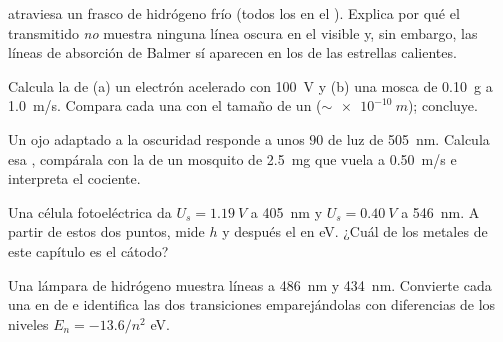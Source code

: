 \begin{exercise}[$\star\star$]\label{exo:g12:quantum-world:9}
 atraviesa un frasco de hidrógeno frío (todos los  en el ). Explica por qué el  transmitido \emph{no} muestra ninguna línea
oscura en el visible y, sin embargo, las líneas de absorción de Balmer sí aparecen en
los  de las estrellas calientes.
\end{exercise}

\begin{exercise}[$\star\star$]\label{exo:g12:quantum-world:10}
Calcula la  de (a) un electrón acelerado con
\qty{100}{V} y (b) una mosca de \qty{0.10}{g} a \qty{1.0}{m/s}. Compara cada una con
el tamaño de un  ($\sim \qty{e-10}{m}$); concluye.
\end{exercise}

\begin{exercise}[$\star\star$]\label{exo:g12:quantum-world:11}
Un ojo adaptado a la oscuridad responde a unos $90$  de luz de \qty{505}{nm}.
Calcula esa , compárala con la  de un mosquito de \qty{2.5}{mg}
que vuela a \qty{0.50}{m/s} e interpreta el cociente.
\end{exercise}

\begin{exercise}[$\star\star\star$]\label{exo:g12:quantum-world:12}
Una célula fotoeléctrica da $U_s = \qty{1.19}{V}$ a \qty{405}{nm} y
$U_s = \qty{0.40}{V}$ a \qty{546}{nm}. A partir de estos dos puntos, mide $h$ y
después el  en \unit{eV}. ¿Cuál de los metales de este capítulo
es el cátodo?
\end{exercise}

\begin{exercise}[$\star\star\star$]\label{exo:g12:quantum-world:13}
Una lámpara de hidrógeno muestra líneas a \qty{486}{nm} y \qty{434}{nm}. Convierte
cada una en  de  e identifica las dos transiciones emparejándolas con
diferencias de los niveles $E_n = -13.6/n^2$ \unit{eV}.
\end{exercise}

